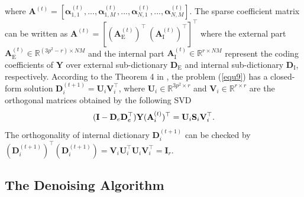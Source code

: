 \documentclass[10pt,twocolumn,letterpaper]{article}
\begin{document}
where $\textbf{A}^{(t)}=[\bm{\alpha}_{1,1}^{(t)},...,\bm{\alpha}_{1,M}^{(t)},...,\bm{\alpha}_{N,1}^{(t)},...,\bm{\alpha}_{N,M}^{(t)}]$. The sparse coefficient matrix can be written as $\mathbf{A}^{(t)}=[(\mathbf{A}_{\text{E}}^{(t)})^{\top}\ (\mathbf{A}_{\text{I}}^{(t)})^{\top}]^{\top}$ where the external part $\mathbf{A}_{\text{E}}^{(t)}\in\mathbb{R}^{(3p^2-r)\times NM}$ and the internal part $\mathbf{A}_{\text{I}}^{(t)}\in\mathbb{R}^{r\times NM}$ represent the coding coefficients of $\mathbf{Y}$ over external sub-dictionary $\mathbf{D}_{\text{E}}$ and internal sub-dictionary $\mathbf{D}_{\text{I}}$, respectively. According to the Theorem 4 in \cite{spca}, the problem (\ref{equ9}) has a closed-form solution $\mathbf{D}_{i}^{(t+1)}=\mathbf{U}_{i}\mathbf{V}_{i}^{\top}$, where $\mathbf{U}_{i}\in\mathbb{R}^{3p^2\times r}$ and $\mathbf{V}_{i}\in\mathbb{R}^{r\times r}$ are the orthogonal matrices obtained by the following SVD
\vspace{-1mm}
\begin{equation}\label{equ10}\vspace{-2mm}
(\mathbf{I}-\mathbf{D}_{e}\mathbf{D}_{e}^{\top})\mathbf{Y}(\mathbf{A}_{i}^{(t)})^{\top}
=
\mathbf{U}_{i}\mathbf{S}_{i}\mathbf{V}_{i}^{\top}.
\end{equation}
The orthogonality of internal dictionary $\mathbf{D}_{i}^{(t+1)}$ can be checked by 
$(\mathbf{D}_{i}^{(t+1)})^{\top}(\mathbf{D}_{i}^{(t+1)})=\mathbf{V}_{i}\mathbf{U}_{i}^{\top}\mathbf{U}_{i}\mathbf{V}_{i}^{\top}=\mathbf{I}_{r}$. 


\subsection{The Denoising Algorithm}
\end{document}
